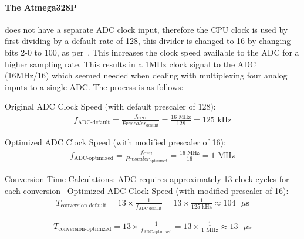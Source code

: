 \paragraph{The Atmega328P} does not have a separate ADC clock input, therefore the CPU clock is used by first dividing by a default rate of 128, this divider is changed to 16 by changing bits 2-0 to 100, as per~\cite[p.219]{RefWorks:atmel2015atmega328p}. This increases the clock speed available to the ADC for a higher sampling rate. This results in a 1MHz clock signal to the ADC (16MHz/16) which seemed needed when dealing with multiplexing four analog inputs to a single ADC. The process is as follows:


Original ADC Clock Speed (with default prescaler of 128):
\begin{equation} \label{origclk}
  \begin{split}
f_\text{ADC-default} = \frac{f_\text{CPU}}{Prescaler_\text{default}} = \frac{16 \text{ MHz}}{128} = 125 \text{ kHz}
  \end{split}
\end{equation}

Optimized ADC Clock Speed (with modified prescaler of 16):
\begin{equation} \label{optimizedclk}
  \begin{split}
f_\text{ADC-optimized} = \frac{f_\text{CPU}}{Prescaler_\text{optimized}} = \frac{16 \text{ MHz}}{16} = 1 \text{ MHz}
\end{split}
\end{equation}

Conversion Time Calculations:
ADC requires approximately 13 clock cycles for each conversion~\cite[p.208]{RefWorks:atmel2015atmega328p}
Optimized ADC Clock Speed (with modified prescaler of 16):
\begin{equation} \label{optimCLKspeed}
  \begin{split}
T_\text{conversion-default} = 13 \times \frac{1}{f_\text{ADC-default}} = 13 \times \frac{1}{125 \text{ kHz}} \approx 104 \text{ $\mu$s}
  \end{split}
\end{equation}

\begin{equation} \label{optimCLKspeed2}
  \begin{split}
T_\text{conversion-optimized} = 13 \times \frac{1}{f_\text{ADC-optimized}} = 13 \times \frac{1}{1 \text{ MHz}} \approx 13 \text{ $\mu$s}
  \end{split}
\end{equation}

